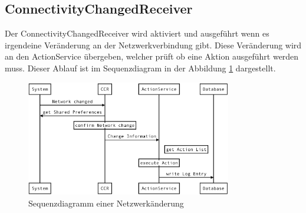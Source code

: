 \subsection{ConnectivityChangedReceiver}
Der ConnectivityChangedReceiver wird aktiviert und ausgeführt wenn es irgendeine Veränderung an der Netzwerkverbindung gibt. Diese Veränderung wird an den ActionService übergeben, welcher prüft ob eine Aktion ausgeführt werden muss. Dieser Ablauf ist im Sequenzdiagram in der Abbildung \ref{fig:seqactions} dargestellt.
\begin{figure}[ht]
    \centering
    \includegraphics[width=0.8\textwidth]{images/seqActions.png}
    \caption{Sequenzdiagramm einer Netzwerkänderung}
    \label{fig:seqactions}
\end{figure}


